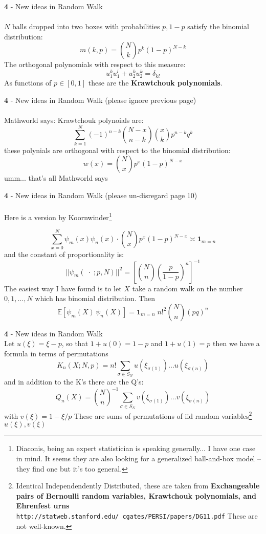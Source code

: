 \documentclass[12pt]{article}
\begin{document}
\newpage

\noindent \textbf{4} - New ideas in Random Walk \\ \\
$N$ balls dropped into two boxes with probabilities $p, 1-p$ satisfy the binomial distribution:
$$ m(k, p) = \binom{N}{k} p^k (1-p)^{N-k}$$
The orthogonal polynomials with respect to this measure:
$$ u_1^k u_1^l + u_2^k u_2^k = \delta_{kl} $$
As functions of $p \in [0,1]$ these are the \textbf{Krawtchouk polynomials}.  


\newpage

\noindent \textbf{4} - New ideas in Random Walk (please ignore previous page)\\ \\
Mathworld says: Krawtchouk polynoials are:
$$ \sum_{k=1}^N (-1)^{n-k} \binom{N-x}{n - k} \binom{x}{k}p^{n-k}q^k$$
these polynials are orthogonal with respect to the binomial distribution:
$$ w(x)= \binom{N}{x} p^x (1-p)^{N-x}$$
umm... that's all Mathworld says

\newpage

\noindent \textbf{4} - New ideas in Random Walk (please un-disregard page 10)\\ \\
Here is a version by Koornwinder\footnote{Diaconis, being an expert statistician is speaking generally...  I have one case in mind. It seems they are also looking for a generalized ball-and-box model -- they find one but it's too general.  }  

$$ \sum_{x=0}^N \psi_m(x) \psi_n(x) \cdot \binom{N}{x} p^x (1-p)^{N-x}
\asymp \mathbf{1}_{m=n} $$
and the constant of proportionality is:
$$||\psi_m( \;\cdot \;;p,N)||^2 = \left[ \binom{N}{n} \left( \frac{p}{1-p} \right)^n \right]^{-1}$$
The easiest way I have found is to let $X$ take a random walk on the number $0,1,\dots, N$ which has binomial distribution.  Then
$$ \mathbb{E}[\psi_m(X)\,\psi_n(X)] = \mathbf{1}_{m=n}\;  n!^2\binom{N}{n}(pq)^n$$

\newpage 

\noindent \textbf{4} - New ideas in Random Walk \\

\noindent Let $u(\xi) = \xi - p$, so that $1+u(0)= 1-p$ and $1+u(1)=p$ then we have a formula in terms of permutations
$$K_n(X; N, p) = n! \sum_{\sigma \in S_N} u(\xi_{\sigma(1)})\dots u(\xi_{\sigma(n)}) $$
and in addition to the K's there are the Q's:
$$Q_n(X) = \binom{N}{n}^{-1} \sum_{\sigma \in S_N} v(\xi_{\sigma(1)})\dots v(\xi_{\sigma(n)}) $$
with $v(\xi)= 1 - \xi/p$ These are sums of permutations of iid random variables\footnote{Identical Independendently Distributed, these are taken from \textbf{Exchangeable pairs of Bernoulli random variables, Krawtchouk polynomials, and Ehrenfest urns} \texttt{http://statweb.stanford.edu/~cgates/PERSI/papers/DG11.pdf}  These are not well-known.} $u(\xi), v(\xi)$
\end{document}
